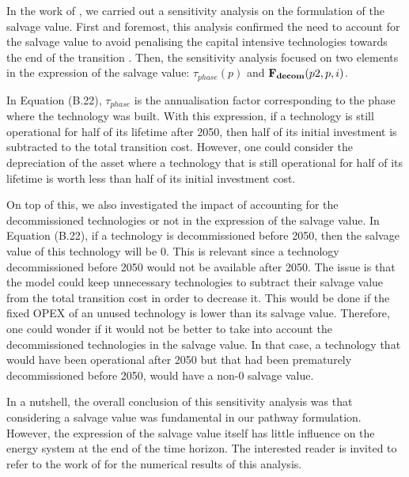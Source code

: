 \documentclass[12pt,a4paper]{article}
\begin{document}
\begin{mdframed}[style=manuscript] %
In the work of \citet{goffauxpathway}, we carried out a sensitivity analysis on the formulation of the salvage value. First and foremost, this analysis confirmed the need to account for the salvage value to avoid penalising the capital intensive technologies towards the end of the transition \cite{poncelet2016myopic}. Then, the sensitivity analysis focused on two elements in the expression of the salvage value: $\tau_{phase}(p)$ and $\textbf{F\textsubscript{decom}}(p2,p,i)$. 

In Equation (B.22), $\tau_{phase}$ is the annualisation factor corresponding to the phase where the technology was built. With this expression, if a technology is still operational for half of its lifetime after 2050, then half of its initial investment is subtracted to the total transition cost. However, one could consider the depreciation of the asset where a technology that is still operational for half of its lifetime is worth less than half of its initial investment cost. 

On top of this, we also investigated the impact of accounting for the decommissioned technologies or not in the expression of the salvage value.  In Equation (B.22), if a technology is decommissioned before 2050, then the salvage value of this technology will be 0. This is relevant since a technology decommissioned before 2050 would not be available after 2050. The issue is that the model could keep unnecessary technologies to subtract their salvage value from the total transition cost in order to decrease it. This would be done if the fixed OPEX of an unused technology is lower than its salvage value. Therefore, one could wonder if it would not be better to take into account the decommissioned technologies in the salvage value. In that case, a technology that would have been operational after 2050 but that had been prematurely decommissioned before 2050, would have a non-0 salvage value.

In a nutshell, the overall conclusion of this sensitivity analysis was that considering a salvage value was fundamental in our pathway formulation. However, the expression of the salvage value itself has little influence on the energy system at the end of the time horizon.  The interested reader is invited to refer to the work of \citet{goffauxpathway} for the numerical results of this analysis.
\end{mdframed}
\end{document}
